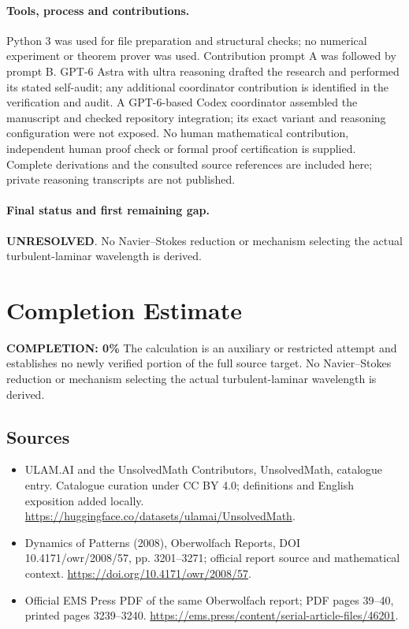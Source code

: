 \documentclass[11pt]{article}
\begin{document}
\paragraph{Tools, process and contributions.}
Python 3 was used for file preparation and structural checks; no numerical experiment or theorem prover was used. Contribution prompt A was followed by prompt B. GPT-6 Astra with ultra reasoning drafted the research and performed its stated self-audit; any additional coordinator contribution is identified in the verification and audit. A GPT-6-based Codex coordinator assembled the manuscript and checked repository integration; its exact variant and reasoning configuration were not exposed. No human mathematical contribution, independent human proof check or formal proof certification is supplied. Complete derivations and the consulted source references are included here; private reasoning transcripts are not published.

\paragraph{Final status and first remaining gap.}
\textbf{UNRESOLVED}. No Navier–Stokes reduction or mechanism selecting the actual turbulent-laminar wavelength is derived.

\section{Completion Estimate}
\noindent\textbf{COMPLETION: 0\%}
The calculation is an auxiliary or restricted attempt and establishes no newly verified portion of the full source target. No Navier–Stokes reduction or mechanism selecting the actual turbulent-laminar wavelength is derived.

\subsection{Sources}
\begin{itemize}
\item[\hypertarget{source:statement:1}{S1}] ULAM.AI and the UnsolvedMath Contributors, UnsolvedMath, catalogue entry. Catalogue curation under CC BY 4.0; definitions and English exposition added locally.
\url{https://huggingface.co/datasets/ulamai/UnsolvedMath}.
\item[\hypertarget{source:statement:2}{S2}] Dynamics of Patterns (2008), Oberwolfach Reports, DOI 10.4171/owr/2008/57, pp. 3201--3271; official report source and mathematical context.
\url{https://doi.org/10.4171/owr/2008/57}.
\item[\hypertarget{source:statement:3}{S3}] Official EMS Press PDF of the same Oberwolfach report; PDF pages 39--40, printed pages 3239--3240.
\url{https://ems.press/content/serial-article-files/46201}.
\end{itemize}
\label{end:statement}
\end{document}
